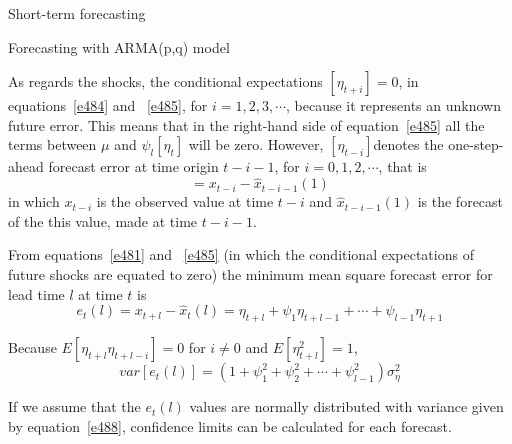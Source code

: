 \documentclass[8pt]{beamer}
\renewcommand{\emph}[1]{\textcolor{myorange}{#1}}
\begin{document}
 \begin{frame}{Short-term forecasting}
    \begin{block}{Forecasting with ARMA(p,q) model}
    \end{block}
    As regards the shocks, the \emph{conditional expectations} $[\eta_{t+i}] = 0$, in equations~\ref{e484} and ~\ref{e485}, for $i=1,2,3,\cdots$, because it represents an unknown future error. This means that in the right-hand side of equation~\ref{e485} all the terms between $\mu$ and $\psi_l [\eta_t]$ will be zero. However, $[\eta_{t-i}]$denotes the \emph{one-step-ahead forecast error} at time origin $t-i-1$, for $i=0,1,2,\cdots$, that is
 \begin{equation}
     [\eta_{t-i}] = x_{t-i} - \hat{x}_{t-i-1} (1)
           \label{e486}
        \end{equation}
        in which $x_{t-i}$ is the observed value at time $t-i$ and $\hat{x}_{t-i-1}(1)$ is the forecast of the this value, made at time $t-i-1$.

        From equations~\ref{e481} and ~\ref{e485} (in which the conditional expectations of future shocks are equated to zero) the \emph{minimum mean square forecast error} for lead time $l$ at time $t$  is
 \begin{equation}
     e_t (l) = x_{t+l} - \hat{x}_t (l) = \eta_{t+l} + \psi_1 \eta_{t+l-1} + \cdots + \psi_{l-1} \eta_{t+1}
           \label{e487}
        \end{equation}

        Because $E[\eta_{t+l} \eta_{t+l-i}] =0$ for $i\neq0$ and $E[\eta_{t+l}^2] = 1$, 
 \begin{equation}
     var[e_t (l)] = \left( 1 + \psi_1^2 + \psi_2^2 + \cdots + \psi_{l-1}^2 \right) \sigma_{\eta}^2
           \label{e488}
        \end{equation}
        
        If we assume that the $e_t (l)$ values are \emph{normally distributed} with variance given by equation~\ref{e488}, confidence limits can be calculated for each forecast.  
\end{frame}

\end{document}
